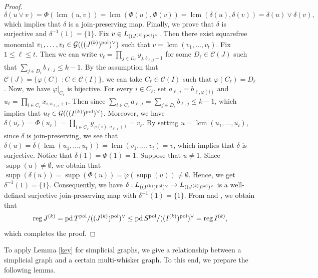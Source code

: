 \documentclass[12pt]{amsart}
\theoremstyle{definition}
\theoremstyle{remark}
\DeclareMathOperator{\pd}{pd}
\DeclareMathOperator{\supp}{supp}
\DeclareMathOperator{\reg}{reg}
\DeclareMathOperator{\lcm}{lcm}
\begin{document}
\begin{proof}
$$\delta(u\vee v)=\Phi(\lcm(u,v))=\lcm(\Phi(u), \Phi(v))=\lcm(\delta(u),\delta(v))=\delta(u)\vee\delta(v),$$which implies that $\delta$ is a join-preserving map. Finally, we prove that $\delta$ is surjective and $\delta^{-1}(1)=\{1\}$. Fix $v\in L_{((J^{(k)})^{\rm pol})^{\vee}}$. Then there exist squarefree monomial $v_{1},\ldots, v_{t}\in\mathcal{G}(((J^{(k)})^{\rm pol})^{\vee})$ such that $v=\lcm(v_{1},\ldots, v_{t})$. Fix $1\leq\ell\leq t$. Then we can write $v_{\ell}=\prod_{j\in D_{\ell}}y_{j,b_{\ell,j}+1}$ for some $D_{\ell}\in\mathcal{C}(J)$ such that $\sum_{j\in D_{\ell}}b_{\ell,j}\leq k-1$. By the assumption that $\mathcal{C}(J)=\{\varphi(C)\,\,: C\in\mathcal{C}(I)\}$, we can take $C_{\ell}\in\mathcal{C}(I)$ such that $\varphi(C_{\ell})=D_{\ell}$. Now, we have $\varphi|_{C_{\ell}}$ is bijective. For every $i\in C_{\ell}$, set $a_{\ell,i}=b_{\ell,\varphi(i)}$ and $u_{\ell}=\prod_{i\in C_{\ell}}x_{i, a_{\ell,i}+1}$. Then since $\sum_{i\in C_{\ell}}a_{\ell,i}=\sum_{j\in D_{\ell}}b_{\ell,j}\leq k-1$, which implies that $u_{\ell}\in\mathcal{G}(((I^{(k)})^{\rm pol})^{\vee})$. Moreover, we have $\delta(u_{\ell})=\Phi(u_{\ell})=\prod_{i\in C_{\ell}}y_{\varphi(i),a_{\ell,i}+1}=v_{\ell}$. By setting $u=\lcm(u_{1},\ldots, u_{t})$, since $\delta$ is join-preserving, we see that $\delta(u)=\delta(\lcm(u_{1},\ldots, u_{t}))=\lcm(v_{1},\ldots, v_{t})=v$, which implies that $\delta$ is surjective. Notice that $\delta(1)=\Phi(1)=1$. Suppose that $u\neq1$. Since $\supp(u)\neq\emptyset$, we obtain that $\supp(\delta(u))=\supp(\Phi(u))=\tilde{\varphi}(\supp(u))\neq\emptyset$. 
Hence, we get $\delta^{-1}(1)=\{1\}$. Consequently, we have $\delta:L_{((I^{(k)})^{\rm pol})^{\vee}}\rightarrow L_{((J^{(k)})^{\rm pol})^{\vee}}$ is a well-defined surjective join-preserving map with $\delta^{-1}(1)=\{1\}$. 
From \cite[Theorem 4.9]{ikmf2017} and \cite[Corollary 0.3]{t1999}, we obtain that 
$$\reg J^{(k)}=\pd T^{\rm pol}/((J^{(k)})^{\rm pol})^{\vee}\leq\pd S^{\rm pol}/((I^{(k)})^{\rm pol})^{\vee}=\reg I^{(k)},$$
which completes the proof. 
\end{proof}

To apply Lemma \ref{key} for simplicial graphs, we give a relationship between a simplicial graph and a certain multi-whisker graph. To this end, we prepare the following lemma. 
\end{document}
